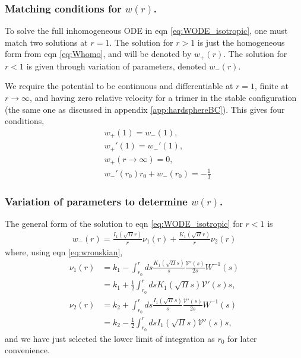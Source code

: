 \documentclass[twocolumn,amsmath,amssymb,aps]{revtex4-1}%
\begin{document}
\subsubsection{Matching conditions for $w(r)$.}
To solve the full inhomogeneous ODE in eqn \ref{eq:WODE_isotropic}, one must
match two solutions at $r=1$. The solution for $r>1$ is just the homogeneous
form from eqn \ref{eq:Whomo}, and will be denoted by $w_{+}(r)$. The solution
for $r<1$ is given through variation of parameters, denoted $w_{-}(r)$.

We require the potential to be continuous and differentiable at $r=1$, finite
at $r\to\infty$, and having zero relative velocity for a trimer in the stable
configuration (the same one as discussed in appendix \ref{app:hardsphereBC}).
This gives four conditions,
\begin{subequations}
  \label{eqs:genericmatchingconditions}
  \begin{align}
    &w_{+}(1)=w_{-}(1),\label{eq:match1}\\
    &w_{+}'(1) = w_{-}'(1),\label{eq:match2}\\
    &w_{+}(r\to\infty)=0,\label{eq:match3}\\
    &w_{-}'(r_0)r_0+w_{-}(r_0)=-\frac{1}{3}\label{eq:match4}
  \end{align}
\end{subequations}

\subsubsection{Variation of parameters to determine $w(r)$.}
The general form of the solution to eqn \ref{eq:WODE_isotropic} for $r<1$ is
\begin{align}
  w_{-}(r) = \frac{I_1(\sqrt{\Pi}r)}{r}\nu_1(r)
  +\frac{K_1(\sqrt{\Pi}r)}{r}\nu_2(r)
\end{align}
where, using eqn \ref{eq:wronskian},
\begin{subequations}
  \label{eqs:ODEcoefficientsVOP}
  \begin{align}
    \nu_1(r)
    &= k_1 - \int_{r_0}^rds\frac{K_1(\sqrt{\Pi}s)}{s}
      \frac{\mathcal{V}'(s)}{2s}W^{-1}(s)\nonumber\\
    &= k_1 + \frac{1}{2}\int_{r_0}^rdsK_1(\sqrt{\Pi}s)
      \mathcal{V}'(s)s,\nonumber\\
    \nu_2(r)
    &= k_2 + \int_{r_0}^rds\frac{I_1(\sqrt{\Pi}s)}{s}
      \frac{\mathcal{V}'(s)}{2s}W^{-1}(s)\nonumber\\
    &= k_2 - \frac{1}{2}\int_{r_0}^rdsI_1(\sqrt{\Pi}s)
      \mathcal{V}'(s)s,
  \end{align}
\end{subequations}
and we have just selected the lower limit of integration as $r_0$ for later
convenience.
\end{document}
